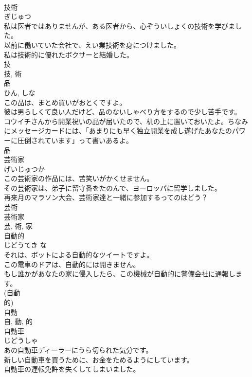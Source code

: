 \documentclass[8pt]{extreport}
\begin{document}
\begin{CJK}{UTF8}{min}
\\	技術	
\\	ぎじゅつ	
\\	私は医者ではありませんが、ある医者から、心ぞういしょくの技術を学びました。	
\\	以前に働いていた会社で、えい業技術を身につけました。	
\\	私は技術的に優れたボクサーと結婚した。	
\\	技 
\\	技, 術	
\\	品	
\\	ひん, しな	
\\	この品は、まとめ買いがおとくですよ。	
\\	彼は男らしくて良い人だけど、品のないしゃべり方をするので少し苦手です。	
\\	コウイチさんから開業祝いの品が届いたので、机の上に置いておいたよ。ちなみにメッセージカードには、「あまりにも早く独立開業を成し遂げたあなたのパワーに圧倒されています」って書いあるよ。	
\\	品	
\\	芸術家	
\\	げいじゅつか	
\\	この芸術家の作品には、苦笑いがかくせません。	
\\	その芸術家は、弟子に留守番をたのんで、ヨーロッパに留学しました。	
\\	再来月のマラソン大会、芸術家達と一緒に参加するってのはどう？	
\\	芸術 
\\	芸術家 
\\	芸, 術, 家	
\\	自動的	
\\	じどうてき	な 
\\	それは、ボットによる自動的なツイートですよ。	
\\	この電車のドアは、自動的には開きません。	
\\	もし誰かがあなたの家に侵入したら、この機械が自動的に警備会社に通報します。	
\\	(自動 
\\	的) 
\\	自動 
\\	自, 動, 的	
\\	自動車	
\\	じどうしゃ	
\\	あの自動車ディーラーにうら切られた気分です。	
\\	新しい自動車を買うために、お金をためるようにしています。	
\\	自動車の運転免許を失くしてしまいました。	

\end{CJK}
\end{document}
